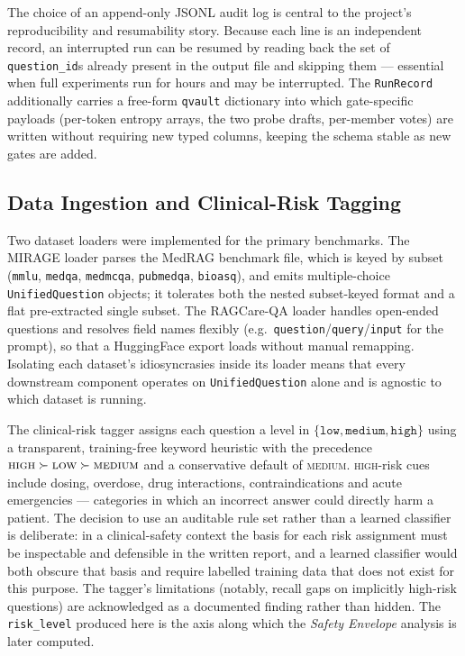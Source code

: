 The choice of an append-only JSONL audit log is central to the project's
reproducibility and resumability story. Because each line is an independent
record, an interrupted run can be resumed by reading back the set of
\texttt{question\_id}s already present in the output file and skipping them ---
essential when full experiments run for hours and may be interrupted. The
\texttt{RunRecord} additionally carries a free-form \texttt{qvault} dictionary
into which gate-specific payloads (per-token entropy arrays, the two probe
drafts, per-member votes) are written without requiring new typed columns,
keeping the schema stable as new gates are added.

\subsection{Data Ingestion and Clinical-Risk Tagging}
\label{sec:impl-data}

Two dataset loaders were implemented for the primary benchmarks. The MIRAGE
loader parses the MedRAG benchmark file, which is keyed by subset
(\texttt{mmlu}, \texttt{medqa}, \texttt{medmcqa}, \texttt{pubmedqa},
\texttt{bioasq}), and emits multiple-choice \texttt{UnifiedQuestion} objects;
it tolerates both the nested subset-keyed format and a flat pre-extracted
single subset. The RAGCare-QA loader handles open-ended questions and resolves
field names flexibly (e.g.\ \texttt{question}/\texttt{query}/\texttt{input}
for the prompt), so that a HuggingFace export loads without manual remapping.
Isolating each dataset's idiosyncrasies inside its loader means that every
downstream component operates on \texttt{UnifiedQuestion} alone and is
agnostic to which dataset is running.

The clinical-risk tagger assigns each question a level in
$\{\texttt{low},\texttt{medium},\texttt{high}\}$ using a transparent,
training-free keyword heuristic with the precedence
$\textsc{high} \succ \textsc{low} \succ \textsc{medium}$ and a conservative
default of \textsc{medium}. \textsc{high}-risk cues include dosing, overdose,
drug interactions, contraindications and acute emergencies --- categories in
which an incorrect answer could directly harm a patient. The decision to use
an auditable rule set rather than a learned classifier is deliberate: in a
clinical-safety context the basis for each risk assignment must be inspectable
and defensible in the written report, and a learned classifier would both
obscure that basis and require labelled training data that does not exist for
this purpose. The tagger's limitations (notably, recall gaps on
implicitly high-risk questions) are acknowledged as a documented finding
rather than hidden. The \texttt{risk\_level} produced here is the axis along
which the \emph{Safety Envelope} analysis is later computed.


